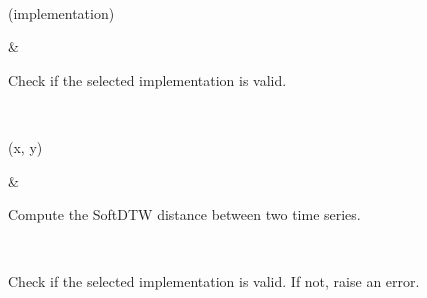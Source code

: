 \documentclass[letterpaper,10pt,english]{sphinxmanual}
\begin{document}
\begin{fulllineitems}
\begin{savenotes}
\begin{longtable}{}
\sphinxbottomrule
{}\\
\endfoot

\endlastfoot
\sphinxtableatstartofbodyhook
\begin{varwidth}[t]{}
\sphinxAtStartPar
{\hyperref[\detokenize{dtw_loss_functions.soft_dtw:dtw_loss_functions.soft_dtw.soft_dtw.check_implementation}]{}}(implementation)
\sphinxbeforeendvarwidth
\end{varwidth}%
&\begin{varwidth}[t]{}
\sphinxAtStartPar
Check if the selected implementation is valid.
\sphinxbeforeendvarwidth
\end{varwidth}%
\\
\sphinxhline\begin{varwidth}[t]{}
\sphinxAtStartPar
{\hyperref[\detokenize{dtw_loss_functions.soft_dtw:dtw_loss_functions.soft_dtw.soft_dtw.forward}]{}}(x, y)
\sphinxbeforeendvarwidth
\end{varwidth}%
&\begin{varwidth}[t]{}
\sphinxAtStartPar
Compute the SoftDTW distance between two time series.
\sphinxbeforeendvarwidth
\end{varwidth}%
\\
\sphinxbottomrule
\end{longtable}
\sphinxtableafterendhook
\sphinxatlongtableend
\end{savenotes}

\begin{fulllineitems}
\label{\detokenize{dtw_loss_functions.soft_dtw:dtw_loss_functions.soft_dtw.soft_dtw.check_implementation}}
\pysigstartsignatures
\pysiglinewithargsret
{}
{}
{}
\pysigstopsignatures
\sphinxAtStartPar
Check if the selected implementation is valid. If not, raise an error.

\end{fulllineitems}



\end{fulllineitems}
\end{document}

